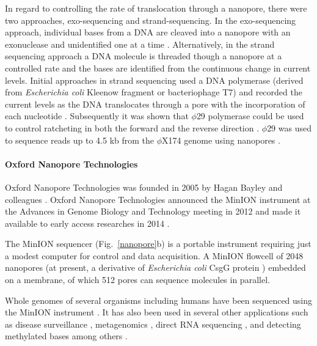 In regard to controlling the rate of translocation through a nanopore,
there were two approaches, exo-sequencing and strand-sequencing.
In the exo-sequencing approach, individual bases from a DNA are cleaved
into a nanopore with an exonuclease and unidentified one at a time
\citep{astier2006toward,clarke2009continuous}.
Alternatively, in the strand sequencing approach a DNA molecule is
threaded though a nanopore at a controlled rate and the bases are
identified from the continuous change in current levels. Initial
approaches in strand sequencing used a DNA polymerase (derived from
\emph{Escherichia coli} Kleenow fragment or bacteriophage T7) and
recorded the current levels as the DNA translocates through a pore with
the incorporation of each nucleotide
\citep{benner2007sequence,cockroft2008single,gyarfas2009mapping,
chu2010real}.
%
Subsequently it was shown that $\phi$29 polymerase could be used to control
ratcheting in both the forward and the reverse direction
\citep{lieberman2010processive,manrao2012reading,cherf2012automated}.
$\phi$29 was used to sequence reads up to 4.5 kb from the $\phi$X174 genome
using nanopores \citep{laszlo2014decoding}.


\paragraph{Oxford Nanopore Technologies}
Oxford Nanopore Technologies was founded in 2005 by Hagan Bayley and
colleagues \citep{deamer2016three}. Oxford Nanopore Technologies
announced the MinION instrument at the Advances in Genome Biology and
Technology meeting in 2012 and made it available to early access
researches in 2014 \citep{deamer2016three,bayley2015nanopore}.

The MinION sequencer (Fig.~\ref{nanopore}b) is a portable instrument
requiring just a modest computer for control and data acquisition.  A
MinION flowcell of 2048 nanopores (at present, a derivative of
\emph{Escherichia coli} CsgG protein \citep{brown2016nanopore}) embedded
on a membrane, of which 512 pores can sequence molecules in parallel.

Whole genomes of several organisms including humans have been sequenced
using the MinION instrument \citep{loman2015complete,stancu2017mapping,
jain2018nanopore,bowden2019sequencing,moss2020complete}. It has also
been used in several other applications such as disease surveillance
\citep{quick2016real,faria2016mobile}, metagenomics
\citep{goordial2017situ,charalampous2019nanopore,leggett2020rapid},
direct RNA sequencing \citep{garalde2018highly,workman2019nanopore,
depledge2019direct}, and detecting methylated bases
\citep{rand2017mapping,simpson2017detecting,liu2019accurate} among
others \citep{jain2016oxford}.


